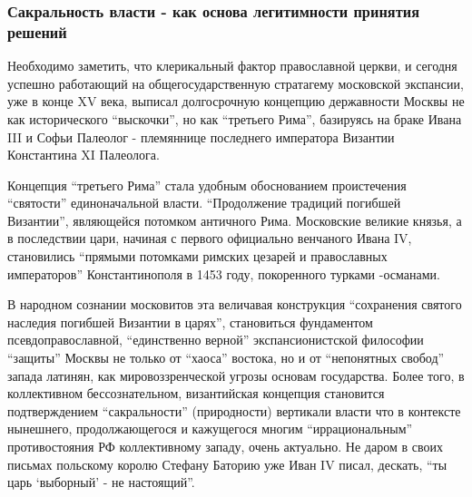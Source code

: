  
 
 
 
 

\subsubsection{Сакральность власти - как основа легитимности принятия решений}
\label{sec:16_01_2022.stz.news.ua.hvylya.1.anatomia_vraga.4.sakralnost_vlasti}

Необходимо заметить, что клерикальный фактор православной церкви, и сегодня
успешно работающий на общегосударственную стратагему московской экспансии, уже
в конце XV века, выписал долгосрочную концепцию державности Москвы не как
исторического \enquote{выскочки}, но как \enquote{третьего Рима}, базируясь на
браке Ивана III и Софьи Палеолог - племяннице последнего императора Византии
Константина XI Палеолога.

Концепция \enquote{третьего Рима} стала удобным обоснованием проистечения
\enquote{святости} единоначальной власти. \enquote{Продолжение традиций
погибшей Византии}, являющейся потомком античного Рима. Московские великие
князья, а в последствии цари, начиная с первого официально венчаного Ивана IV,
становились \enquote{прямыми потомками римских цезарей и православных
императоров} Константинополя в 1453 году, покоренного турками -османами.

В народном сознании московитов эта величавая конструкция \enquote{сохранения
святого наследия погибшей Византии в царях}, становиться фундаментом
псевдоправославной, \enquote{единственно верной} экспансионистской философии
\enquote{защиты} Москвы не только от \enquote{хаоса} востока, но и от
\enquote{непонятных свобод} запада латинян, как мировоззренческой угрозы
основам государства. Более того, в коллективном бессознательном, византийская
концепция становится подтверждением \enquote{сакральности} (природности)
вертикали власти что в контексте нынешнего, продолжающегося и кажущегося многим
\enquote{иррациональным} противостояния РФ коллективному западу, очень
актуально. Не даром в своих письмах польскому королю Стефану Баторию уже Иван
IV писал, дескать, \enquote{ты царь \enquote{выборный} - не настоящий}.

